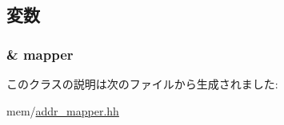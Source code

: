 \subsection{変数}
\hypertarget{classAddrMapper_1_1MapperMasterPort_a85ab1c024f81c47e0a2c4e4261eabfb4}{
\subsubsection[{mapper}]{\& {\bf mapper}}}
\label{classAddrMapper_1_1MapperMasterPort_a85ab1c024f81c47e0a2c4e4261eabfb4}


このクラスの説明は次のファイルから生成されました:\begin{DoxyCompactItemize}
\item 
mem/\hyperlink{addr__mapper_8hh}{addr\_\-mapper.hh}\end{DoxyCompactItemize}
